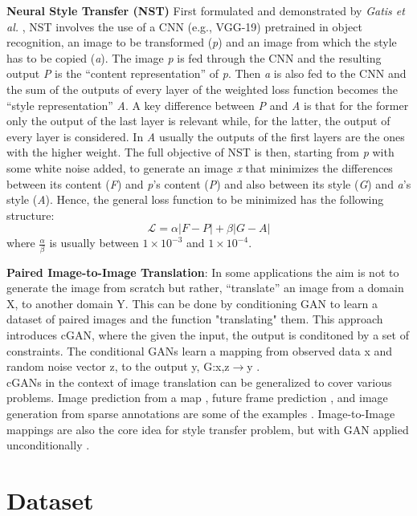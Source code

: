 \documentclass[10pt,twocolumn,letterpaper]{article}
\begin{document}
\textbf{Neural Style Transfer (NST)} First formulated and demonstrated by \textit{Gatis et al.} \cite{NST}, NST involves the use of a CNN (e.g., VGG-19) pretrained in object recognition, an image to be transformed (\textit{p}) and an image from which the style has to be copied (\textit{a}).
The image \textit{p} is fed through the CNN and the resulting output \textit{P} is the “content representation” of \textit{p}. Then \textit{a} is also fed to the CNN and the sum of the outputs of every layer of the weighted loss function becomes the “style representation” \textit{A}. A key difference between \textit{P} and \textit{A} is that for the former only the output of the last layer is relevant while, for the latter, the output of every layer is considered. In \textit{A} usually the outputs of the first layers are the ones with the higher weight.
The full objective of NST is then, starting from \textit{p} with some white noise added, to generate an image \textit{x} that minimizes the differences between its content (\textit{F}) and \textit{p}’s content (\textit{P}) and also between its style (\textit{G}) and \textit{a}’s style (\textit{A}).
Hence, the general loss function to be minimized has the following structure:
$$\mathcal{L} = \alpha | F - P | + \beta | G - A |$$
where $\frac{\alpha}{\beta}$ is usually between $1\times10^{-3}$ and $1\times10^{-4}$.


\textbf{Paired Image-to-Image Translation}: In some applications the aim is not to generate the image from scratch but rather, “translate” an image from a domain X, to another domain Y.  This can be done by conditioning GAN to learn a dataset of paired images and the function "translating" them. This approach introduces cGAN, where the given the input, the output is conditoned by a set of constraints. The conditional GANs learn a mapping from observed data x and random noise vector z, to the output y, G:{x,z}$\rightarrow$y \cite{imgtoimg}.
\\ cGANs in the context of image translation can be generalized to cover various problems. Image prediction from a map \cite{example1}, future frame prediction \cite{example2}, and image generation from sparse annotations are some of the examples \cite{example3}. Image-to-Image mappings are also the core idea for style transfer problem, but with GAN applied unconditionally \cite{example4}.\\

\section{Dataset}
\end{document}
